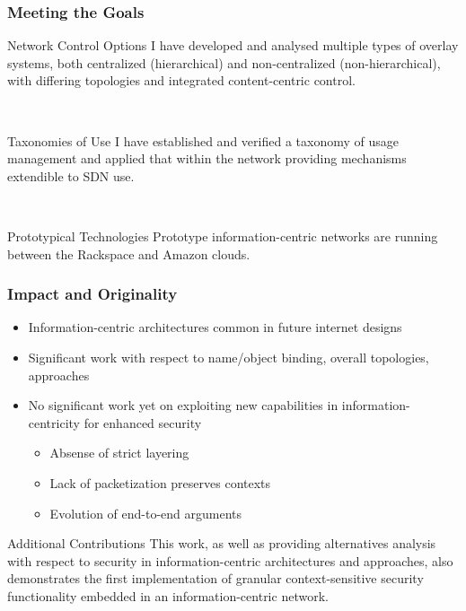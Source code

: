 \documentclass[t,handout]{beamer}
\begin{document}
\begin{frame}
\frametitle{Meeting the Goals}
\begin{beamerboxesrounded}[shadow]{Network Control Options}
{\small I have developed and analysed multiple types of overlay systems, both centralized (hierarchical) and non-centralized (non-hierarchical), with differing topologies and integrated content-centric control.}
\end{beamerboxesrounded}
~\\
\begin{beamerboxesrounded}[shadow]{Taxonomies of Use}
{\small I have established and verified a taxonomy of usage management and applied that within the network providing mechanisms extendible to SDN use.}
\end{beamerboxesrounded}
~\\
\begin{beamerboxesrounded}[shadow]{Prototypical Technologies}
{\small Prototype information-centric networks are running between the Rackspace and Amazon clouds.}
\end{beamerboxesrounded}
\end{frame}

\begin{frame}
\frametitle{Impact and Originality}
\begin{itemize}
\item Information-centric architectures common in future internet designs
\item Significant work with respect to name/object binding, overall topologies, approaches
\item No significant work yet on exploiting new capabilities in information-centricity for enhanced security
\begin{itemize}
\item {\small Absense of strict layering}
\item {\small Lack of packetization preserves contexts} 
\item {\small Evolution of end-to-end arguments}
\end{itemize}
\end{itemize}
\begin{beamerboxesrounded}[shadow]{Additional Contributions}
{\small This work, as well as providing alternatives analysis with respect to security in information-centric architectures and approaches, also demonstrates the first implementation of granular context-sensitive security functionality embedded in an information-centric network.}
\end{beamerboxesrounded}
\end{frame}
\end{document}
